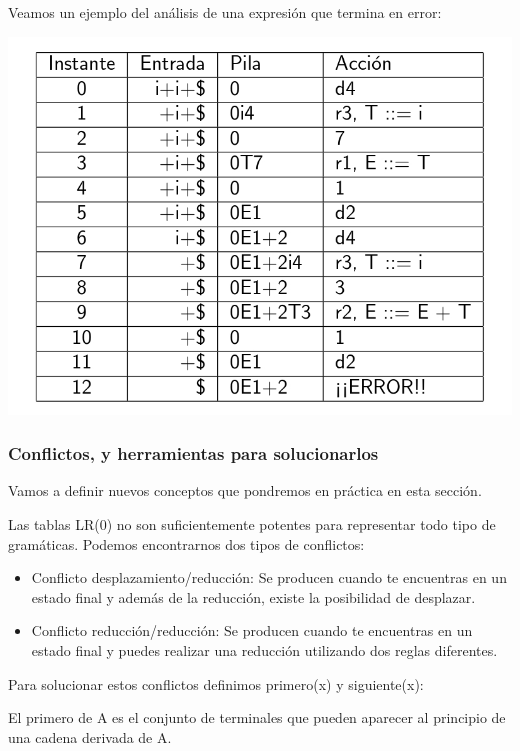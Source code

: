 \documentclass{apuntes}
\begin{document}
\begin{example}
Veamos un ejemplo del análisis de una expresión que termina en error:

\begin{center}
\includegraphics[scale=0.3]{img/tablaanallr0error.jpg}
\end{center}
\end{example}

\subsubsection{Conflictos, y herramientas para solucionarlos}
Vamos a definir nuevos conceptos que pondremos en práctica en esta sección.

Las tablas LR(0) no son suficientemente potentes para representar todo tipo de gramáticas. Podemos encontrarnos dos tipos de conflictos:

\begin{itemize}
\item Conflicto desplazamiento/reducción: Se producen cuando te encuentras en un estado final y además de la reducción, existe la posibilidad de desplazar.
\item Conflicto reducción/reducción: Se producen cuando te encuentras en un estado final y puedes realizar una reducción utilizando dos reglas diferentes.
\end{itemize}

Para solucionar estos conflictos definimos primero(x) y siguiente(x):

\begin{defn}[Primero(A)]
El primero de A es el conjunto de terminales que pueden aparecer al principio de una cadena derivada de A.
\end{defn}
\end{document}
